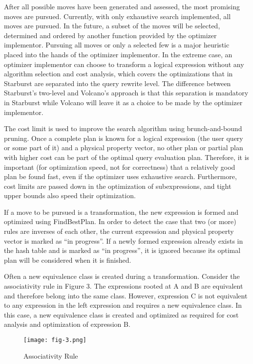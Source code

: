 \documentclass[a4paper,12pt,notitlepage,twoside,openright]{article}
\begin{document}
After all possible moves have been generated and assessed, the most
promising moves are pursued. Currently, with only exhaustive search
implemented, all moves are pursued. In the future, a subset of the moves
will be selected, determined and ordered by another function provided by
the optimizer implementor. Pursuing all moves or only a selected few is
a major heuristic placed into the hands of the optimizer implementor. In
the extreme case, an optimizer implementor can choose to transform a
logical expression without any algorithm selection and cost analysis,
which covers the optimizations that in Starburst are separated into the
query rewrite level. The difference between Starburst's two-level and
Volcano's approach is that this separation is mandatory in Starburst
while Volcano will leave it as a choice to be made by the optimizer
implementor.

The cost limit is used to improve the search algorithm using
brunch-and-bound pruning. Once a complete plan is known for a logical
expression (the user query or some part of it) and a physical property
vector, no other plan or partial plan with higher cost can be part of
the optimal query evaluation plan. Therefore, it is important (for
optimization speed, not for correctness) that a relatively good plan be
found fast, even if the optimizer uses exhaustive search. Furthermore,
cost limits are passed down in the optimization of subexpressions, and
tight upper bounds also speed their optimization.

If a move to be pursued is a transformation, the new expression is
formed and optimized using FindBestPlan. In order to detect the case
that two (or more) rules are inverses of each other, the current
expression and physical property vector is marked as ``in progress''. If a
newly formed expression already exists in the hash table and is marked
as ``in progress'', it is ignored because its optimal plan will be
considered when it is finished.

Often a new equivalence class is created during a transformation.
Consider the associativity rule in Figure 3. The expressions rooted at A
and B are equivalent and therefore belong into the same class. However,
expression C is not equivalent to any expression in the left expression
and requires a new equivalence class. In this case, a new equivalence
class is created and optimized as required for cost analysis and
optimization of expression B.

\begin{figure}
  \centering
  \texttt{[image: fig-3.png]}
  \caption{Associativity Rule}
\end{figure}
\end{document}
